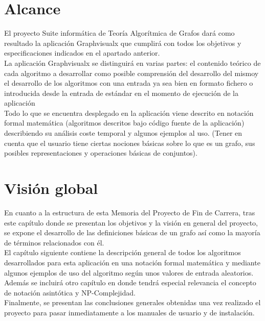 \section{Alcance}

El proyecto Suite informática de Teoría Algorítmica de Grafos dará como resultado la aplicación Graphvisualx que cumplirá con todos los objetivos y especificaciones indicados en el apartado anterior.\\

La aplicación Graphvisualx se distinguirá en varias partes: el contenido teórico de cada algoritmo a desarrollar como posible comprensión del desarrollo del mismoy el desarrollo de los algoritmos con una entrada ya sea bien en formato fichero o introducida desde la entrada de estándar en el momento de ejecución de la aplicación\\

Todo lo que se encuentra desplegado en la aplicación viene descrito en notación formal matemática (algoritmos descritos bajo código fuente de la aplicación) describiendo su análisis coste temporal y algunos ejemplos al uso. (Tener en cuenta que el usuario tiene ciertas nociones básicas sobre lo que es un grafo, sus posibles representaciones y operaciones básicas de conjuntos).\\

\section{Visión global}

En cuanto a la estructura de esta Memoria del Proyecto de Fin de Carrera, tras este capítulo donde se presentan los objetivos y la visión en general del proyecto, se expone el desarrollo de las definiciones básicas de un grafo así como la mayoría de términos relacionados con él.\\

El capítulo siguiente contiene la descripción general de todos los algoritmos desarrollados para esta aplicación en una notación formal matemática y mediante algunos ejemplos de uso del algoritmo según unos valores de entrada aleatorios. \\

Además se incluirá otro capítulo en donde tendrá especial relevancia el concepto de notación asintótica y NP-Complejidad. \\

Finalmente, se presentan las conclusiones generales obtenidas una vez realizado el proyecto para pasar inmediatamente a los manuales de usuario y de instalación. \\

